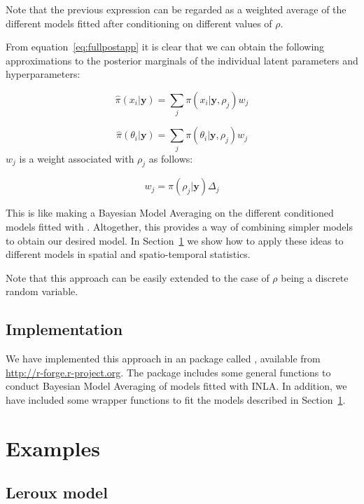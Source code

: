 \documentclass[article]{jss}
\begin{document}
Note that the previous expression can be regarded as a weighted average
of the different models fitted after conditioning on different values of
$\rho$.

From equation~\ref{eq:fullpostapp} it is clear that we can obtain the following
approximations to the posterior marginals of the individual latent parameters
and hyperparameters:

$$
\hat{\pi}(x_i|\mathbf{y}) = \sum_j \pi(x_i|\mathbf{y}, \rho_j) w_j
$$

$$
\hat{\pi}(\theta_i|\mathbf{y}) = \sum_j \pi(\theta_i|\mathbf{y}, \rho_j) w_j
$$
\noindent
$w_j$ is a weight associated with $\rho_j$ as follows:

$$
w_j = \pi(\rho_j|\mathbf{y})\Delta_j
$$

This is like making a Bayesian Model Averaging \citep{Hoetingetal:1999} on the
different conditioned models fitted with . Altogether, this
provides a way of combining simpler models to obtain our desired model. In
Section~\ref{sec:examples} we show how to apply these ideas to different models
in spatial and spatio-temporal statistics.


%

Note that this approach can be easily extended to the case of $\rho$ being
a discrete random variable.


\subsection{Implementation}

We have implemented this approach in an  package called ,
available from \url{http://r-forge.r-project.org}. The package includes some
general functions to conduct Bayesian Model Averaging of models fitted with
INLA. In addition, we have included some wrapper functions to fit the models
described in Section~\ref{sec:examples}.


\section{Examples}
\label{sec:examples}

\subsection{Leroux model}
\end{document}
